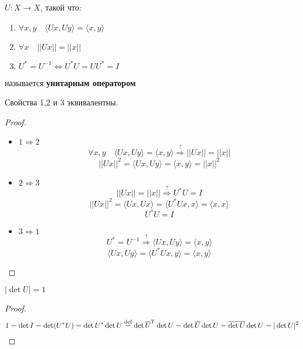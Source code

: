

\cfoot{}

\renewcommand{\thesubsection}{\arabic{subsection}.}
\makeatletter
\renewcommand*{\@seccntformat}[1]{\csname the#1\endcsname\hspace{0.1cm}}
\makeatother




\begin{definition}
    $U : X\to X$, такой что:
    \begin{enumerate}
        \item $\forall x,y \quad \langle Ux, Uy \rangle = \langle x, y\rangle$
        \item $\forall x \quad ||Ux||=||x||$
        \item $U^* = U^{-1} \Leftrightarrow U^*U=UU^*=I$
    \end{enumerate}
    называется \textbf{унитарным оператором}
\end{definition}

\begin{theorem}
    Свойства 1,2 и 3 эквивалентны.
\end{theorem}
\begin{proof}
    \begin{itemize}
        \item $1\Rightarrow 2$
              $$\forall x,y \quad \langle Ux, Uy \rangle = \langle x, y\rangle \stackrel{?}{\Rightarrow} ||Ux||=||x||$$
              $$||Ux||^2 = \langle Ux, Uy \rangle = \langle x, y\rangle = ||x||^2$$
        \item $2\Rightarrow 3$
              $$||Ux||=||x|| \stackrel{?}{\Rightarrow} U^*U=I$$
              $$||Ux||^2 = \langle Ux, Ux \rangle = \langle U^*Ux, x \rangle = \langle x, x\rangle$$
              $$U^*U=I$$
        \item $3\Rightarrow 1$
              $$U^*=U^{-1} \stackrel{?}{\Rightarrow} \langle Ux, Uy \rangle = \langle x, y\rangle$$
              $$\langle Ux, Uy \rangle = \langle U^*Ux, y \rangle = \langle x, y\rangle$$
    \end{itemize}
\end{proof}
\begin{lemma}
    $|\det U| = 1$
\end{lemma}
\begin{proof}
    $$1 = \det I = \det(U^*U)=\det U^* \det U \stackrel{\text{def}}{=} \det \overline U^T \det U = \det \overline U \det U=\overline {\det U} \det U = |\det U|^2$$
\end{proof}

